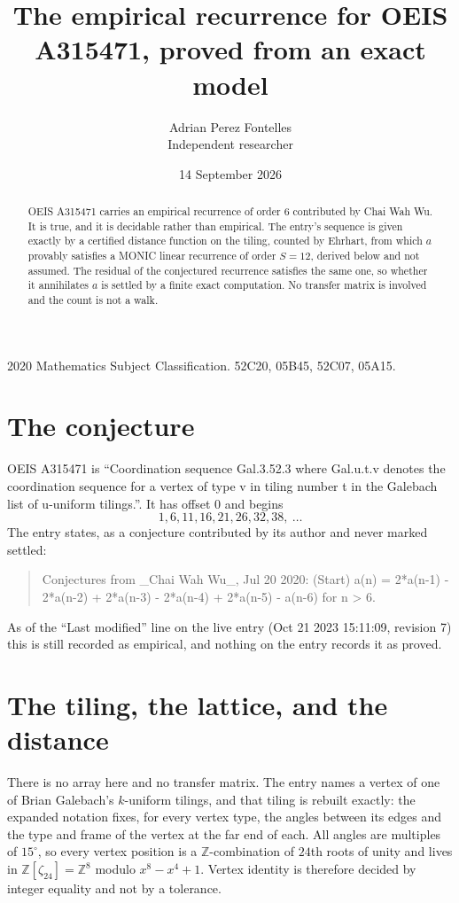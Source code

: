\documentclass[11pt,a4paper]{article}
\title{The empirical recurrence for OEIS A315471, proved from an exact model}
\author{Adrian Perez Fontelles\\ \small Independent researcher}
\date{14 September 2026}
\theoremstyle{plain}
\theoremstyle{definition}
\begin{document}
\maketitle

\begin{abstract}
OEIS A315471 carries an empirical recurrence of order $6$ contributed by Chai Wah Wu. It is true, and it is
decidable rather than empirical. The entry's sequence is given exactly by a certified distance function on the tiling, counted by Ehrhart, from
which $a$ provably satisfies a MONIC linear recurrence of order $S=12$, derived below and not
assumed. The residual of the conjectured recurrence satisfies the same one, so whether it
annihilates $a$ is settled by a finite exact computation. No transfer matrix is involved and the count is not a walk.
\end{abstract}

\noindent\small 2020 Mathematics Subject Classification. 52C20, 05B45, 52C07, 05A15.\normalsize

\section{The conjecture}

OEIS A315471 is ``Coordination sequence Gal.3.52.3 where Gal.u.t.v denotes the coordination sequence for a vertex of type v in tiling number t in the Galebach list of u-uniform tilings.''. It has offset $0$ and begins
\[
1, 6, 11, 16, 21, 26, 32, 38,\ \dots
\]
The entry states, as a conjecture contributed by its author and never marked settled:
\begin{quote}
Conjectures from \_Chai Wah Wu\_, Jul 20 2020: (Start) a(n) = 2*a(n-1) - 2*a(n-2) + 2*a(n-3) - 2*a(n-4) + 2*a(n-5) - a(n-6) for n > 6.
\end{quote}
As of the ``Last modified'' line on the live entry (Oct 21 2023 15:11:09, revision 7)
this is still recorded as empirical, and nothing on the entry records it as proved.

\section{The tiling, the lattice, and the distance}

There is no array here and no transfer matrix. The entry names a vertex of one of Brian
Galebach's $k$-uniform tilings, and that tiling is rebuilt exactly: the expanded notation
fixes, for every vertex type, the angles between its edges and the type and frame of the
vertex at the far end of each. All angles are multiples of $15^\circ$, so every vertex
position is a $\mathbb{Z}$-combination of $24$th roots of unity and lives in
$\mathbb{Z}[\zeta_{24}]=\mathbb{Z}^{8}$ modulo $x^{8}-x^{4}+1$. Vertex identity is
therefore decided by integer equality and not by a tolerance.
\end{document}
